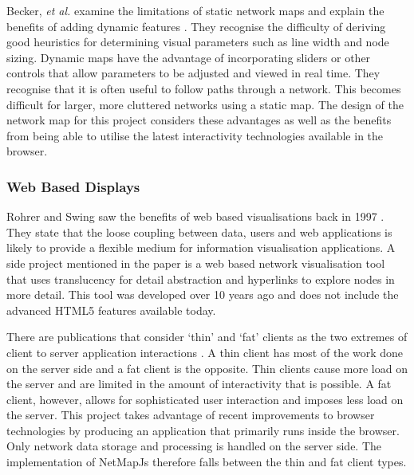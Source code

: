 \documentclass[11pt, a4paper]{article}
\begin{document}
Becker, \emph{et al.} examine the limitations of static network maps and explain
the benefits of adding dynamic features \cite{Becker_1990}. They recognise the
difficulty of deriving good heuristics for determining visual parameters such as
line width and node sizing. Dynamic maps have the advantage of incorporating
sliders or other controls that allow parameters to be adjusted and viewed in
real time. They recognise that it is often useful to follow paths through a
network. This becomes difficult for larger, more cluttered networks using
a static map. The design of the network map for this project considers these
advantages as well as the benefits from being able to utilise the latest
interactivity technologies available in the browser.



\subsubsection{Web Based Displays}
\label{sec:web-based-displays}

Rohrer and Swing saw the benefits of web based visualisations back in 1997
\cite{Rohrer_1997}. They state that the loose coupling between data, users and
web applications is likely to provide a flexible medium for information
visualisation applications.  A side project mentioned in the paper is a web
based network visualisation tool that uses translucency for detail abstraction
and hyperlinks to explore nodes in more detail. This tool was developed over 10
years ago and does not include the advanced HTML5 features available today.

  
There are publications that consider `thin' and `fat' clients as the two
extremes of client to server application interactions
\cite{Eick_2007}\cite{Jern_1998}. A thin client has most of the work done on the
server side and a fat client is the opposite. Thin clients cause more load on
the server and are limited in the amount of interactivity that is possible. A
fat client, however, allows for sophisticated user interaction and imposes less
load on the server. This project takes advantage of recent improvements to
browser technologies by producing an application that primarily runs inside the
browser. Only network data storage and processing is handled on the server side.
The implementation of NetMapJs therefore falls between the thin and fat client
types.
\end{document}
